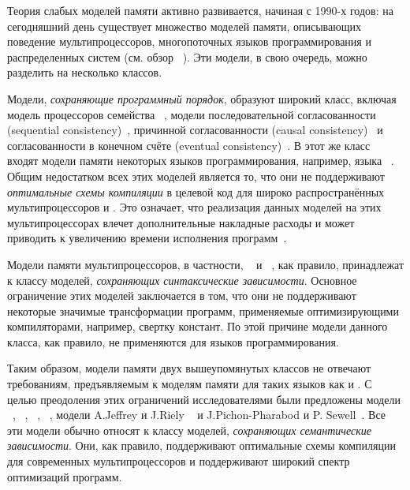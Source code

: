 Теория слабых моделей памяти активно развивается, начиная с 1990-х годов: 
на сегодняшний день существует множество моделей памяти, 
описывающих поведение мультипроцессоров, 
многопоточных языков программирования и распределенных систем (см. обзор ~\autocite{Moiseenko-al:PCS21}). 
Эти модели, в свою очередь, можно разделить на несколько классов.

Модели, \emph{сохраняющие программный порядок}, образуют широкий класс,
включая модель \TSO процессоров семейства \Intel~\autocite{Sewell-al:CACM10},
модели последовательной согласованности (sequential consistency)~\autocite{Lamport:TC79},
причинной согласованности (causal consistency)~\autocite{Lahav-Boker:PLDI2020}
и согласованности в конечном счёте (eventual consistency)~\autocite{Jagadeesan-al:ESOP2018}. В этот же класс входят  модели памяти некоторых языков программирования, например,
языка \OCaml~\autocite{Dolan-al:PLDI18}.
Общим недостатком всех этих моделей является то,
что они не поддерживают \emph{оптимальные схемы компиляции} 
в целевой код для широко распространённых мультипроцессоров \ARM и \POWER.
Это означает, что реализация данных моделей на этих мультипроцессорах
влечет дополнительные накладные расходы и может приводить
к увеличению времени исполнения программ~\autocite{Ou-Demsky:OOPSLA18}. 

Модели памяти мультипроцессоров,
в частности, \ARM~\autocite{Pulte-al:POPL18} и \POWER~\autocite{Sarkar-al:PLDI11}, 
как правило, принадлежат к классу моделей, \emph{сохраняющих синтаксические зависимости}. 
Основное ограничение этих моделей заключается в том, 
что они не поддерживают некоторые значимые трансформации программ, 
применяемые оптимизирующими компиляторами, например, свертку констант.
По этой причине модели данного класса, как правило,
не применяются для языков программирования.  

Таким образом, модели памяти двух вышеупомянутых классов 
не отвечают требованиям, предъявляемым к моделям памяти для таких языков как \CPP и \Java. 
С целью преодоления этих ограничений исследователями были предложены модели  
\Prm~\autocite{Kang-al:POPL17}, \Wkm~\autocite{Chakraborty-Vafeiadis:POPL19}, 
\MRD~\autocite{Paviotti-al:ESOP20}, \PwP~\autocite{Jagadeesan-al:OOPSLA2020},
модели A.Jeffrey и J.Riely ~\autocite{Jeffrey-Riely:LICS16} и J.Pichon-Pharabod и P. Sewell~\autocite{PichonPharabod-Sewell:POPL16}. Все эти модели
обычно относят к классу моделей, \emph{сохраняющих семантические зависимости}.
Они, как правило, поддерживают оптимальные схемы компиляции
для современных мультипроцессоров и поддерживают широкий спектр оптимизаций программ. 


